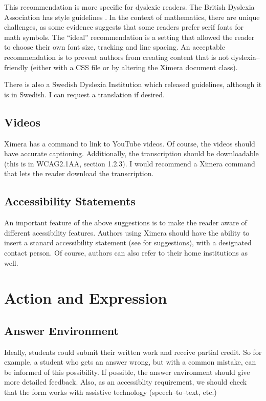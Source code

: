 \documentclass{ximera}
\begin{document}
This recommendation is more specific for dyslexic readers. The British Dyslexia Association has 
style guidelines \cite{BD}. In the context of mathematics, there are unique challenges, as some evidence 
suggests that some readers prefer serif fonts for math symbols. The ``ideal'' recommendation is a setting
that allowed the reader to choose their own font size, tracking and line spacing. An acceptable recommendation
is to prevent authors from creating content that is not dyslexia--friendly (either with a CSS file or
by altering the Ximera document class). 

There is also a Swedish Dyslexia Institution which released guidelines, although it is in Swedish. 
I can request a translation if desired. 





\subsection{Videos}

Ximera has a command to link to YouTube videos. Of course, the videos should have accurate captioning. 
Additionally, the transcription should be downloadable (this is in WCAG2.1AA, section 1.2.3). 
I would recommend a Ximera command that lets the reader download the transcription. 

\subsection{Accessibility Statements}

An important feature of the above suggestions is to make the reader aware of different acessibility features.
Authors using Ximera should have the ability to insert a stanard accessibility statement (see \cite{W3C} 
for suggestions), with a designated contact person. Of course, authors can also refer to their home 
institutions as well. 

\section{Action and Expression}

\subsection{Answer Environment}

Ideally, students could submit their written work and receive partial credit. So for example, 
a student who gets an answer wrong, but with a common mistake, can be informed of this possibility. 
If possible, the answer environment should give more detailed feedback. Also, as an accessiblity 
requirement, we should check that the form works with assistive technology (speech--to--text, etc.)
\end{document}
